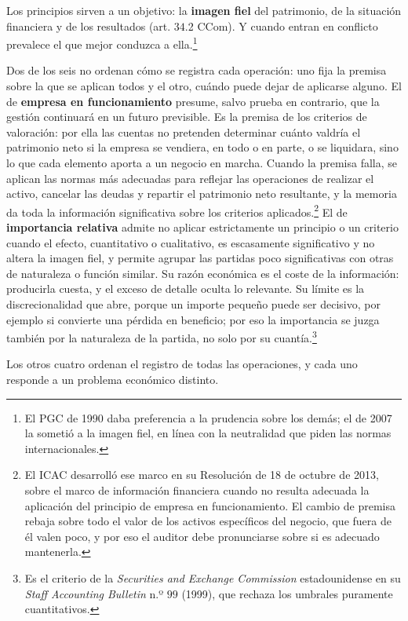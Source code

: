 \documentclass[10pt,a4paper]{article}
\begin{document}
Los principios sirven a un objetivo: la \textbf{imagen fiel} del patrimonio, de la situación financiera y de los resultados (art. $34$.2 CCom). Y cuando entran en conflicto prevalece el que mejor conduzca a ella.\footnote{%
  El PGC de 1990 daba preferencia a la prudencia sobre los demás; el de 2007 la sometió a la imagen fiel, en línea con la neutralidad que piden las normas internacionales.
}

Dos de los seis no ordenan cómo se registra cada operación: uno fija la premisa sobre la que se aplican todos y el otro, cuándo puede dejar de aplicarse alguno. El de \textbf{empresa en funcionamiento} presume, salvo prueba en contrario, que la gestión continuará en un futuro previsible. Es la premisa de los criterios de valoración: por ella las cuentas no pretenden determinar cuánto valdría el patrimonio neto si la empresa se vendiera, en todo o en parte, o se liquidara, sino lo que cada elemento aporta a un negocio en marcha. Cuando la premisa falla, se aplican las normas más adecuadas para reflejar las operaciones de realizar el activo, cancelar las deudas y repartir el patrimonio neto resultante, y la memoria da toda la información significativa sobre los criterios aplicados.\footnote{%
    El ICAC desarrolló ese marco en su Resolución de 18 de octubre de 2013, sobre el marco de información financiera cuando no resulta adecuada la aplicación del principio de empresa en funcionamiento. El cambio de premisa rebaja sobre todo el valor de los activos específicos del negocio, que fuera de él valen poco, y por eso el auditor debe pronunciarse sobre si es adecuado mantenerla.
} El de \textbf{importancia relativa} admite no aplicar estrictamente un principio o un criterio cuando el efecto, cuantitativo o cualitativo, es escasamente significativo y no altera la imagen fiel, y permite agrupar las partidas poco significativas con otras de naturaleza o función similar. Su razón económica es el coste de la información: producirla cuesta, y el exceso de detalle oculta lo relevante. Su límite es la discrecionalidad que abre, porque un importe pequeño puede ser decisivo, por ejemplo si convierte una pérdida en beneficio; por eso la importancia se juzga también por la naturaleza de la partida, no solo por su cuantía.\footnote{%
    Es el criterio de la \textit{Securities and Exchange Commission} estadounidense en su \textit{Staff Accounting Bulletin} n.º $99$ (1999), que rechaza los umbrales puramente cuantitativos.
}

Los otros cuatro ordenan el registro de todas las operaciones, y cada uno responde a un problema económico distinto.
\end{document}
